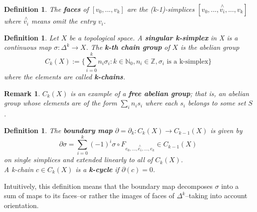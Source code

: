 \documentclass{article}
\newtheorem{definition}[theorem]{Definition}
\newtheorem{remark}[theorem]{Remark}
\begin{document}
\begin{definition}
The \textbf{faces} of $[v_0,...,v_k]$ are the (k-1)-simplices $[v_0,...,\overset{\wedge}{v_i},...,v_k]$ where $\overset{\wedge}{v_i}$ means omit the entry $v_i$.
\end{definition}

\begin{definition}
Let $X$ be a topological space. A \textbf{singular k-simplex} in X is a continuous map $\sigma\colon\Delta^k\to X$. The \textbf{k-th chain group} of $X$ is the abelian group\[C_k(X):=\{\sum_{i=0}^kn_i\sigma_i:k\in\mathbb{N}_0,n_i\in\mathbb{Z},\sigma_i \text{ is a k-simplex}\}\] where the elements are called \textbf{k-chains}.
\end{definition}
\begin{remark}
$C_k(X)$ is an example of a \textbf{free abelian group}; that is, an abelian group whose elements are of the form $\sum_in_is_i$ where each $s_i$ belongs to some set $S$.
\end{remark}


\begin{definition}
The \textbf{boundary map} $\partial=\partial_k\colon C_k(X)\to C_{k-1}(X)$ is given by\[\partial\sigma=\sum_{i=0}^k(-1)^i\sigma\circ F_{e_0,...,\overset{\wedge}{e_i},...,e_k}\in C_{k-1}(X)\]
on single simplices and extended linearly to all of $C_k(X)$.\\
A k-chain $c\in C_k(X)$ is a \textbf{k-cycle} if $\partial(c)=0$.
\end{definition}
\noindent Intuitively, this definition means that the boundary map decomposes $\sigma$ into a sum of maps to its faces--or rather the images of faces of $\Delta^k$--taking into account orientation.
\end{document}
